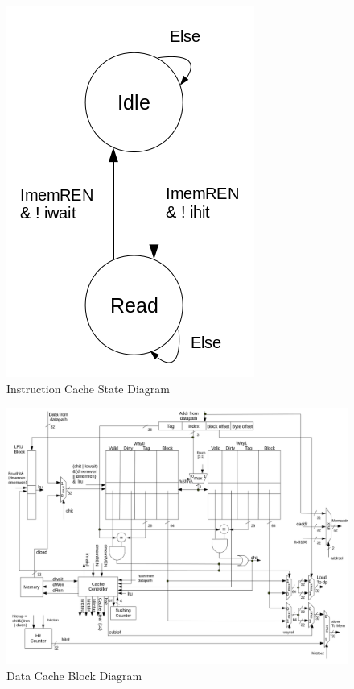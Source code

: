 \documentclass[12pt]{article}
\begin{document}
  \newpage
  \begin{figure}[hp]
    \begin{center}
      \includegraphics{diagrams/icache_state_machine.png}
    \end{center}

    \caption{Instruction Cache State Diagram}
		\label{fig:icache_sd}
  \end{figure}

  \newpage
  \begin{figure}[hp]
    \begin{center}
      \includegraphics[width=\textwidth]{diagrams/diagram_dcache.png}
    \end{center}

    \caption{Data Cache Block Diagram}
		\label{fig:dcache}
  \end{figure}
\end{document}
